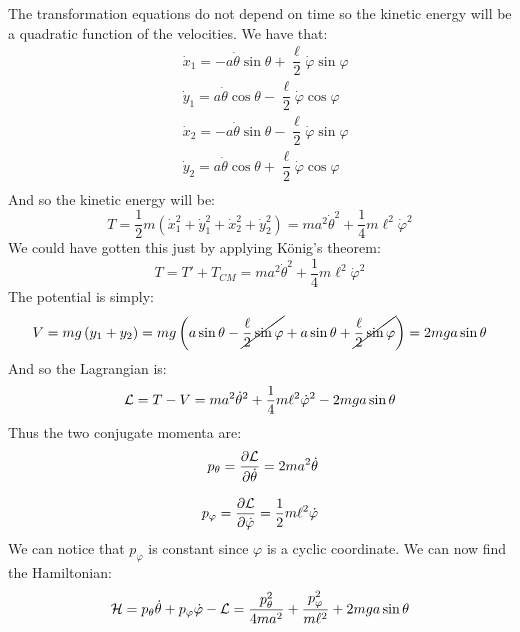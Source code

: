 The transformation equations do not depend on time so the kinetic energy will be a quadratic function of the velocities. We have that:
\begin{equation}
  \begin{split}
    &\dot{x}_1 = -a\dot{\theta}\sin\theta + \dfrac{\ell}{2}\dot{\varphi}\sin\varphi \\[8pt]
    &\dot{y}_1 = a\dot{\theta}\cos\theta - \dfrac{\ell}{2}\dot{\varphi}\cos\varphi \\[8pt]
    &\dot{x}_2 = -a\dot{\theta}\sin\theta - \dfrac{\ell}{2}\dot{\varphi}\sin\varphi \\[8pt]
    &\dot{y}_2 = a\dot{\theta}\cos\theta + \dfrac{\ell}{2}\dot{\varphi}\cos\varphi \\[8pt]
  \end{split}
\end{equation}
And so the kinetic energy will be:
\begin{equation}
  T = \frac{1}{2}m\left(\dot{x}_1^2 + \dot{y}_1^2 + \dot{x}_2^2 + \dot{y}_2^2\right) = m a^2 \dot{\theta}^2 + \frac{1}{4} m \ell^2 \dot{\varphi}^2
\end{equation}
We could have gotten this just by applying König's theorem:
\begin{equation}
  T = T' + T_{CM} = m a^2 \dot{\theta}^2 + \frac{1}{4} m \ell^2 \dot{\varphi}^2
\end{equation}
The potential is simply:
\begin{equation}
  V = mg\left(y_1 + y_2\right) = mg\left(a\sin\theta - \cancel{\dfrac{\ell}{2}\sin\varphi} + a\sin\theta + \cancel{\dfrac{\ell}{2}\sin\varphi}\right) = 2mga\sin\theta
\end{equation}
And so the Lagrangian is:
\begin{equation}
  \mathcal{L} = T - V = m a^2 \dot{\theta}^2 + \frac{1}{4} m \ell^2 \dot{\varphi}^2 - 2mga\sin\theta
\end{equation}
Thus the two conjugate momenta are:
\begin{equation}
  \begin{split}
    p_{\theta} = \pdv{\lagr}{\dot{\theta}} = 2m a^2 \dot{\theta} \\[8pt]
    p_{\varphi} = \pdv{\lagr}{\dot{\varphi}} = \dfrac{1}{2} m \ell^2 \dot{\varphi}
  \end{split}
\end{equation}
We can notice that $p_{\varphi}$ is constant since $\varphi$ is a cyclic coordinate. We can now find the Hamiltonian:
\begin{equation}
  \mathcal{H} = p_{\theta}\dot{\theta} + p_{\varphi}\dot{\varphi} - \mathcal{L} = \frac{p_{\theta}^2}{4ma^2} + \frac{p_{\varphi}^2}{m\ell^2} + 2mga\sin\theta
\end{equation}
